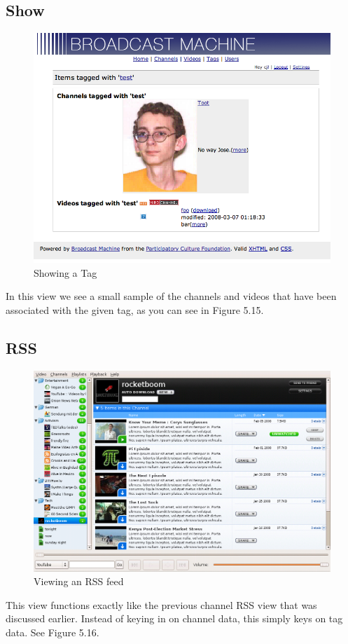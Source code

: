 \documentclass[a4paper,12pt]{report}
\begin{document}
\subsection{Show}
\begin{figure}[htp]
\begin{center}
\includegraphics[width=150mm]{./images/tagshow.png}
\end{center}
\caption{Showing a Tag}
\end{figure}

In this view we see a small sample of the channels and videos that have been associated with the given tag, as you can see in Figure 5.15.

\subsection{RSS}
\begin{figure}[htp]
\begin{center}
\includegraphics[width=150mm]{./images/channelrss.png}
\end{center}
\caption{Viewing an RSS feed}
\end{figure}
This view functions exactly like the previous channel RSS view that was discussed earlier.
Instead of keying in on channel data, this simply keys on tag data. See Figure 5.16.
\end{document}

